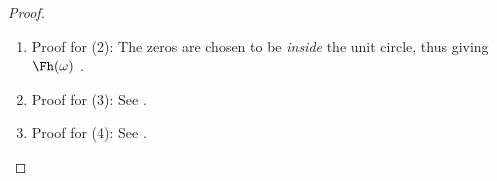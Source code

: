 \begin{proof}
\begin{enumerate}
\begin{enumerate}
    \item Proof that $\Fphi(\omega)$ is  at $0$:
      \begin{align*}
            &\Zh(z) = \sqrt{2}\brp{\frac{1+z^{-1}}{2}}^p Q(z)
            && \text{by \prefp{def:Dp}}
          \\&\implies \text{$\fpsi$ has \prope{$p$ vanishing moments}}
            && \text{by \prefp{lem:van_factor}}
          \\&\implies \text{$\Fphi(\omega)$ is \prope{continuous} at $\omega=0$}
            && \text{by \prefp{thm:vanish_continuous}}
      \end{align*}

    \item Proof that $\ds\inf_{\omega\in\intcc{-\pi/2}{\pi/2}}\abs{\Dh(\omega)}>0$:\\ 
          by ---note that the zeros are never on the unit circle in the range $\intcc{-\pi/2}{\pi/2}$.
  \end{enumerate}


\item Proof for (2): The zeros are chosen to be \emph{inside} the unit circle, thus giving $\Fh(\omega)$ .

\item Proof for (3): See .

\item Proof for (4): See .
\end{enumerate}
\end{proof}



